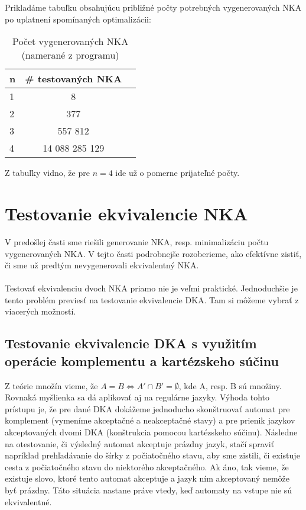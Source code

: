 Prikladáme tabuľku obsahujúcu približné počty potrebných vygenerovaných NKA po uplatnení spomínaných optimalizácii:

\begin{table}[h]
  \centering
  \begin{tabular}{|l|c|r|}
    \hline
    n & \# testovaných NKA \\
    \hline
    1 & 8 \\ 
    \hline
    2 & 377 \\ 
    \hline
    3 & 557 812 \\
    \hline
    4 & 14 088 285 129 \\
    \hline
  \end{tabular}
  
  \caption{Počet vygenerovaných NKA (namerané z programu)}
  
  \label{tab:pocVsNKA}
\end{table}

Z tabuľky vidno, že pre $n=4$ ide už o pomerne prijateľné počty.

\section{Testovanie ekvivalencie NKA}
V predošlej časti sme riešili generovanie NKA, resp. minimalizáciu počtu vygenerovaných NKA. V tejto časti podrobnejše rozoberieme, ako efektívne zistiť, či sme už predtým nevygenerovali ekvivalentný NKA.

\paragraph{}
Testovať ekvivalenciu dvoch NKA priamo nie je veľmi praktické. Jednoduchšie je tento problém previesť na testovanie ekvivalencie DKA. Tam si môžeme vybrať z viacerých možností.

\subsection{Testovanie ekvivalencie DKA s využitím operácie komplementu a kartézskeho súčinu}
Z teórie množín vieme, že $A = B \Longleftrightarrow A' \cap B' = \emptyset$, kde A, resp. B sú množiny. Rovnaká myšlienka sa dá aplikovať aj na regulárne jazyky. Výhoda tohto prístupu je, že pre dané DKA dokážeme jednoducho skonštruovať automat pre komplement (vymeníme akceptačné a neakceptačné stavy) a pre prienik jazykov akceptovaných dvomi DKA (konštrukcia pomocou kartézskeho súčinu). Následne na otestovanie, či výsledný automat akceptuje prázdny jazyk, stačí spraviť napríklad prehľadávanie do šírky z počiatočného stavu, aby sme zistili, či existuje cesta z počiatočného stavu do niektorého akceptačného. Ak áno, tak vieme, že existuje slovo, ktoré tento automat akceptuje a jazyk ním akceptovaný nemôže byť prázdny. Táto situácia nastane práve vtedy, keď automaty na vstupe nie sú ekvivalentné.

